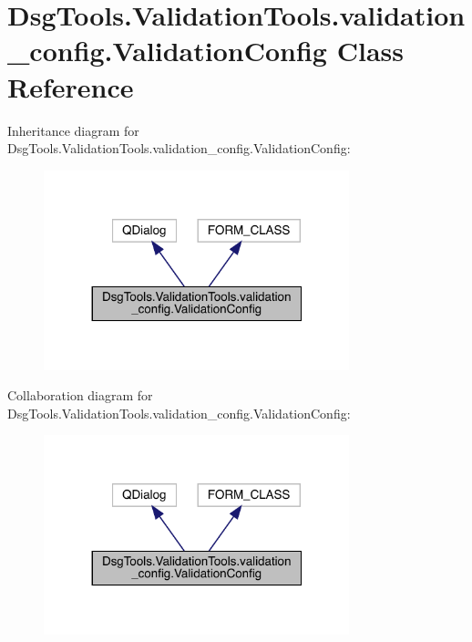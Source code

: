 \hypertarget{class_dsg_tools_1_1_validation_tools_1_1validation__config_1_1_validation_config}{}\section{Dsg\+Tools.\+Validation\+Tools.\+validation\+\_\+config.\+Validation\+Config Class Reference}
\label{class_dsg_tools_1_1_validation_tools_1_1validation__config_1_1_validation_config}


Inheritance diagram for Dsg\+Tools.\+Validation\+Tools.\+validation\+\_\+config.\+Validation\+Config\+:
\nopagebreak
\begin{figure}[H]
\begin{center}
\leavevmode
\includegraphics[width=251pt]{class_dsg_tools_1_1_validation_tools_1_1validation__config_1_1_validation_config__inherit__graph}
\end{center}
\end{figure}


Collaboration diagram for Dsg\+Tools.\+Validation\+Tools.\+validation\+\_\+config.\+Validation\+Config\+:
\nopagebreak
\begin{figure}[H]
\begin{center}
\leavevmode
\includegraphics[width=251pt]{class_dsg_tools_1_1_validation_tools_1_1validation__config_1_1_validation_config__coll__graph}
\end{center}
\end{figure}
